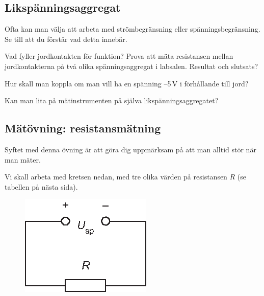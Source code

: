 \documentclass[a4paper,11pt]{article}
\begin{document}
\subsection*{Likspänningsaggregat}

Ofta kan man välja att arbeta med strömbegränsning eller 
spänningsbegränsning. Se till att du förstår vad detta innebär.

Vad fyller jordkontakten för funktion? Prova att mäta resistansen 
mellan jordkontakterna på två olika spänningsaggregat i labsalen. 
Resultat och slutsats?



Hur skall man koppla om man vill ha en spänning --5\,V i förhållande 
till jord?

Kan man lita på mätinstrumenten på själva likspänningsaggregatet? 






\subsection*{Mätövning: resistansmätning}

Syftet med denna övning är att göra dig uppmärksam på att man alltid 
stör när man mäter.

Vi skall arbeta med kretsen nedan, med tre olika värden på 
resistansen $R$ (se tabellen på nästa sida).

\begin{figure}[h]
	\centering
	\includegraphics{fig01.eps}
\end{figure}
\end{document}
